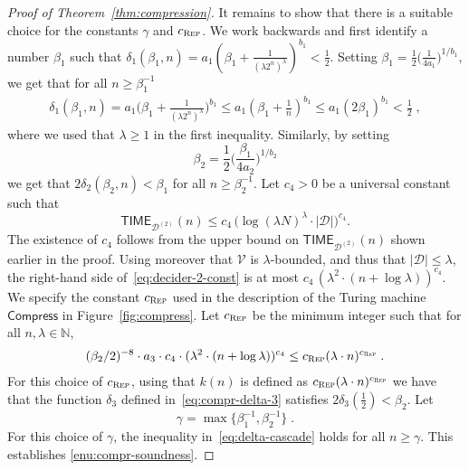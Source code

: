 \documentclass[11pt]{article}
\theoremstyle{definition}
\newcommand{\N}{\ensuremath{\mathbb{N}}}
\newcommand{\decider}{\mathcal{D}}
\newcommand{\verifier}{\mathcal{V}}
\newcommand{\gamestyle}[1]{\ensuremath{\textsc{#1}}\xspace}
\newcommand{\TIME}{\mathsf{TIME}}
\newcommand{\tmstyle}[1]{\ensuremath{\mathsf{#1}}}
\newcommand{\Compress}{\tmstyle{Compress}}
\newcommand{\rep}{\gamestyle{Rep}}
\begin{document}
\begin{proof}[Proof of Theorem~\ref{thm:compression}]
  It remains to show that there is a suitable choice for the constants $\gamma$
  and $c_\rep$.
  We work backwards and first identify a number $\beta_1$ such that
  $\delta_1(\beta_1,n) = a_1(\beta_1 + \frac{1}{(\lambda 2^n)^\lambda})^{b_1} <
  \frac{1}{2}$.
  Setting $\beta_1 = \frac{1}{2}\big( \frac{1}{4a_1} \big)^{1/b_1}$, we get that
  for all $n \geq \beta_1^{-1}$
  \begin{align*}
    \delta_1(\beta_1,n) = a_1 \Big(\beta_1 + \frac{1}{(\lambda 2^n)^\lambda}
    \Big)^{b_1} \leq a_1 (\beta_1 + \frac{1}{n} )^{b_1} \leq a_1(2\beta_1)^{b_1}
    < \frac{1}{2} \;,
  \end{align*}
  where we used that $\lambda \geq 1$ in the first inequality.
  Similarly, by setting
  \[
    \beta_2 = \frac{1}{2} \big (\frac{\beta_1}{4 a_2} \big )^{1/b_2}
  \]
  we get that $2\delta_2(\beta_2,n) < \beta_1$ for all $n \geq
  \beta_2^{-1}$.
  Let $c_4 > 0$ be a universal constant such that
  \begin{equation}
    \label{eq:decider-2-const}
    \TIME_{\decider^{(2)}}(n) \leq c_4\, \bigl( \log (\lambda N)^\lambda
    \cdot |\decider| \bigr)^{c_4}.
  \end{equation}
  The existence of $c_4$ follows from the upper bound on
  $\TIME_{\decider^{(2)}}(n)$ shown earlier in the proof.
  Using moreover that $\verifier$ is $\lambda$-bounded, and thus that
  $|\decider| \leq \lambda$, the right-hand side of~\eqref{eq:decider-2-const}
  is at most $c_4\, (\lambda^2 \cdot \left (n+ \log \lambda \right))^{c_4}$.
  We specify the constant $c_\rep$ used in the description of the Turing machine
  $\Compress$ in Figure~\ref{fig:compress}.
  Let $c_\rep$ be the minimum integer such that for all $n,\lambda \in \N$,
  \begin{align}
    \label{eq:c_rep}
    (\beta_2/2)^{-8} \cdot a_3 \cdot c_4 \cdot (\lambda^2 \cdot
    (n + \log \lambda))^{c_4} \leq c_\rep (\lambda \cdot n)^{c_\rep}\;.
  \end{align}
  For this choice of $c_\rep$, using that $k(n)$ is defined as $c_\rep ( \lambda
  \cdot n)^{c_\rep}$ we have that the function $\delta_3$ defined
  in~\eqref{eq:compr-delta-3} satisfies $2\delta_3(\frac{1}{2}) < \beta_2$.
  Let 
  \begin{equation}
  \label{eq:gamma-recursive}
  	\gamma = \max \{ \beta_1^{-1}, \beta_2^{-1} \} \;.
  \end{equation}
  For this choice of $\gamma$, the inequality in~\eqref{eq:delta-cascade} holds
  for all $n \geq \gamma$. 
  This establishes \cref{enu:compr-soundness}.


\end{proof}
\end{document}
